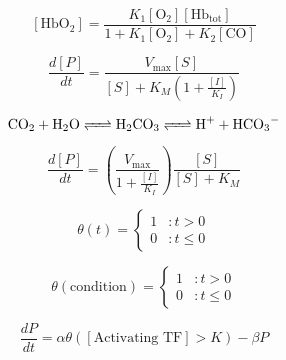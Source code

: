 \documentclass{article}
\begin{document}
\[ \left[ \textrm{HbO$_2$}\right] = \frac{K_1 \left[ \textrm{O}_2 \right] \left[ \textrm{Hb}_{\textrm{tot}} \right] }{1 + K_1 \left[ \textrm{O}_2 \right] + K_2 \left[ \textrm{CO} \right] } \]

\[\frac{d\left[ P \right]}{dt} = \frac{V_{\textrm{max}} \left[ S \right]}{\left[ S \right] + K_M \left( 1 + \frac{\left[ I \right]}{K_I} \right)} \]

\[ \ce{\textrm{CO}_2 + \textrm{H$_2$O} <=> \textrm{H$_2$CO}_3 <=> \textrm{H}^+ + \textrm{HCO}_3^-} \]

\[\frac{d\left[ P \right]}{dt} = \left( \frac{V_{\textrm{max}}}{1 + \frac{\left[ I \right]}{K_I}} \right) \frac{\left[ S \right]}{\left[ S \right] + K_M } \]

\[ \theta(t) = \left\{
     \begin{array}{lr}
       1 & : t > 0\\
       0 & : t \leq 0
     \end{array}
   \right.
   \]
   
   \[ \theta(\textrm{condition}) = \left\{
     \begin{array}{lr}
       1 & : t > 0\\
       0 & : t \leq 0
     \end{array}
   \right.
   \]
   
   \[ \frac{dP}{dt} = \alpha \theta \left( \left[ \textrm{Activating TF} \right] > K \right) - \beta P \]
\end{document}
